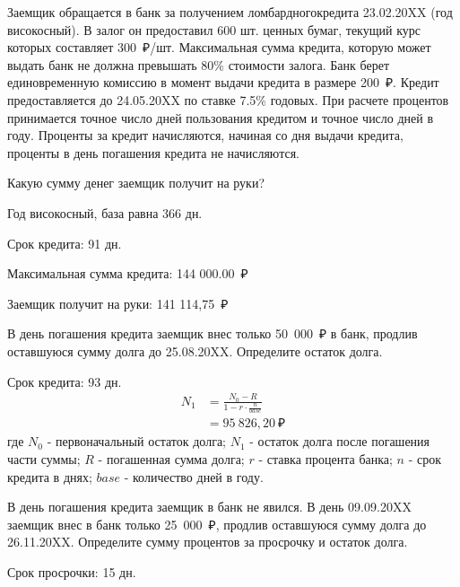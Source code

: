 \documentclass[12pt, table]{exam}
\begin{document}
\begin{questions}
\begin{subparts}
\begin{solution}[12em]
	\end{solution}
	
\end{subparts}
\addpoints

\pagebreak
\question[15] Заемщик обращается в банк за получением ломбардного\linebreak кредита 23.02.20XX (год високосный). В залог он предоставил 600 шт. ценных бумаг, текущий курс которых составляет 300~₽/шт. Максимальная сумма кредита, которую может выдать банк не должна превышать 80\% стоимости залога. Банк берет единовременную комиссию в момент выдачи кредита в размере 200~₽. Кредит предоставляется до 24.05.20XX по ставке 7.5\% годовых. При расчете процентов принимается точное число дней пользования кредитом и точное число дней в году. Проценты за кредит начисляются, начиная со дня выдачи кредита, проценты в день погашения кредита не начисляются. 
\noaddpoints
\begin{subparts}
	\subpart[5]Какую сумму денег заемщик получит на руки?
	\begin{solution}[12em]
		
		Год високосный, база равна 366 дн. 
		
		Срок кредита: 91 дн.
		
		Максимальная сумма кредита: 144 000.00~₽
		
		Заемщик получит на руки: 141 114,75~₽
		
	\end{solution}
	
	\subpart[5] В день погашения кредита заемщик внес только 50~000~₽ в банк, продлив оставшуюся сумму долга до 25.08.20XX.  Определите остаток долга.
	\begin{solution}[12em]
		\begin{multicols}{2}
			\setlength{\columnsep}{1cm}
			Срок кредита: 93 дн.
			\begin{align}
			N_1&=\frac{N_0-R}{1-r \cdot \frac{n}{base}}\\
			&=95~826,20~₽\nonumber
			\end{align}
			где $N_0$ - первоначальный остаток долга; $N_1$ - остаток долга после погашения части суммы; $R$ - погашенная сумма долга; $r$ - ставка процента банка; $n$ - срок кредита в днях; $base$ - количество дней в году.
		\end{multicols}
	\end{solution}
	
	\subpart[5] В день погашения кредита заемщик в банк не явился. В день 09.09.20XX заемщик внес в банк только 25~000~₽, продлив оставшуюся сумму долга до 26.11.20XX.  Определите сумму процентов за просрочку и остаток долга.
	\begin{solution}[6em]
		Срок просрочки: 15 дн.
		

\end{solution}
\end{subparts}
\end{questions}
\end{document}
